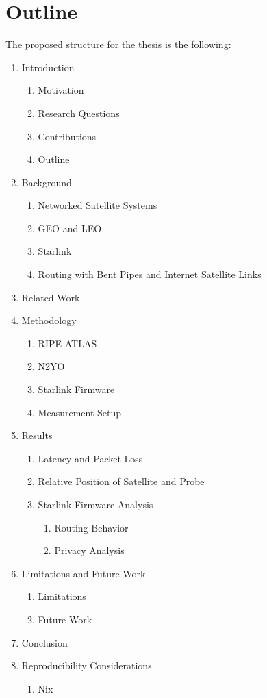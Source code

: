\pagebreak

\section{Outline} \label{sec:outline}

The proposed structure for the thesis is the following:

\begin{enumerate}
	\item Introduction
	      \begin{enumerate}
		      \item Motivation
		      \item Research Questions
		      \item Contributions
		      \item Outline
	      \end{enumerate}
	\item Background
	      \begin{enumerate}
		      \item Networked Satellite Systems
		      \item GEO and LEO
		      \item Starlink
		      \item Routing with Bent Pipes and Internet Satellite Links
	      \end{enumerate}
	\item Related Work
	\item Methodology
	      \begin{enumerate}
		      \item RIPE ATLAS
		      \item N2YO
		      \item Starlink Firmware
		      \item Measurement Setup
	      \end{enumerate}
	\item Results
	      \begin{enumerate}
		      \item Latency and Packet Loss
		      \item Relative Position of Satellite and Probe
		      \item Starlink Firmware Analysis
		            \begin{enumerate}
			            \item{Routing Behavior}
			            \item{Privacy Analysis}
		            \end{enumerate}
	      \end{enumerate}
	\item Limitations and Future Work
	      \begin{enumerate}
		      \item Limitations
		      \item Future Work
	      \end{enumerate}
	\item Conclusion
	\item Reproducibility Considerations
	      \begin{enumerate}
		      \item Nix
	      \end{enumerate}
\end{enumerate}
